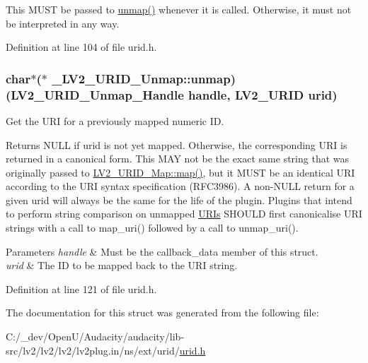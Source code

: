 This M\+U\+ST be passed to \hyperlink{struct___l_v2___u_r_i_d___unmap_a2185877d2fa62b6356d0caa095eb5d0b}{unmap()} whenever it is called. Otherwise, it must not be interpreted in any way. 

Definition at line 104 of file urid.\+h.

\subsubsection[{\texorpdfstring{unmap}{unmap}}]{ char$\ast$($\ast$ \+\_\+\+L\+V2\+\_\+\+U\+R\+I\+D\+\_\+\+Unmap\+::unmap) ({\bf L\+V2\+\_\+\+U\+R\+I\+D\+\_\+\+Unmap\+\_\+\+Handle} {\bf handle}, {\bf L\+V2\+\_\+\+U\+R\+ID} urid)}\hypertarget{struct___l_v2___u_r_i_d___unmap_a2185877d2fa62b6356d0caa095eb5d0b}{}\label{struct___l_v2___u_r_i_d___unmap_a2185877d2fa62b6356d0caa095eb5d0b}
Get the U\+RI for a previously mapped numeric ID.

Returns N\+U\+LL if {\ttfamily urid} is not yet mapped. Otherwise, the corresponding U\+RI is returned in a canonical form. This M\+AY not be the exact same string that was originally passed to \hyperlink{struct___l_v2___u_r_i_d___map_a560d625bc0aacd00fd8e6e1e2915bf1a}{L\+V2\+\_\+\+U\+R\+I\+D\+\_\+\+Map\+::map()}, but it M\+U\+ST be an identical U\+RI according to the U\+RI syntax specification (R\+F\+C3986). A non-\/\+N\+U\+LL return for a given {\ttfamily urid} will always be the same for the life of the plugin. Plugins that intend to perform string comparison on unmapped \hyperlink{struct_u_r_is}{U\+R\+Is} S\+H\+O\+U\+LD first canonicalise U\+RI strings with a call to map\+\_\+uri() followed by a call to unmap\+\_\+uri().


\begin{DoxyParams}{Parameters}
{\em handle} & Must be the callback\+\_\+data member of this struct. \\
\hline
{\em urid} & The ID to be mapped back to the U\+RI string. \\
\hline
\end{DoxyParams}


Definition at line 121 of file urid.\+h.



The documentation for this struct was generated from the following file\+:\begin{DoxyCompactItemize}
\item 
C\+:/\+\_\+dev/\+Open\+U/\+Audacity/audacity/lib-\/src/lv2/lv2/lv2/lv2plug.\+in/ns/ext/urid/\hyperlink{urid_8h}{urid.\+h}\end{DoxyCompactItemize}
